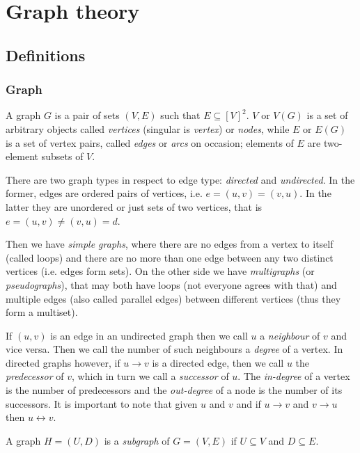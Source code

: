 \section{Graph theory}

  \subsection{Definitions}
        
    \subsubsection{Graph}

      A graph $G$ is a pair of sets $(V, E)$ such that $E \subseteq [V]^2$. $V$ or $V(G)$ is a set of arbitrary objects called \emph{vertices} (singular is \emph{vertex}) or \emph{nodes}, while $E$ or $E(G)$ is a set of vertex pairs, called \emph{edges} or \emph{arcs} on occasion; elements of $E$ are two-element subsets of $V$\cite{Diestel2012}.
      
      There are two graph types in respect to edge type: \emph{directed} and \emph{undirected}. In the former, edges are ordered pairs of vertices, i.e. $e = (u, v) = (v, u)$. In the latter they are unordered or just sets of two vertices, that is $e = (u, v) \neq (v, u) = d$.
      
      Then we have \emph{simple graphs}, where there are no edges from a vertex to itself (called loops) and there are no more than one edge between any two distinct vertices (i.e. edges form sets). On the other side we have \emph{multigraphs} (or \emph{pseudographs}), that may both have loops (not everyone agrees with that) and multiple edges (also called parallel edges) between different vertices (thus they form a multiset).

      If $(u, v)$ is an edge in an undirected graph then we call $u$ a \emph{neighbour} of $v$ and vice versa. Then we call the number of such neighbours a \emph{degree} of a vertex. In directed graphs however, if $u \rightarrow v$ is a directed edge, then we call $u$ the \emph{predecessor} of $v$, which in turn we call a \emph{successor} of $u$. The \emph{in-degree} of a vertex is the number of predecessors and the \emph{out-degree} of a node is the number of its successors. It is important to note that given $u$ and $v$ and if $u \rightarrow v$ and $v \rightarrow u$ then $u \leftrightarrow v$.

      A graph $H = (U, D)$ is a \emph{subgraph} of $G = (V, E)$ if $U \subseteq V$ and $D \subseteq E$.


